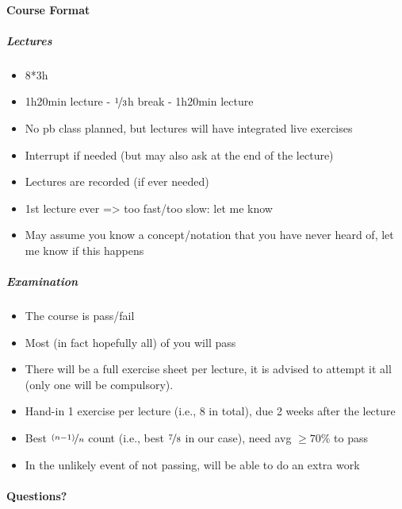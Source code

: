 \documentclass[11pt,a4paper]{report}
\begin{document}
	\paragraph{Course Format}
	\subparagraph{Lectures}
	\begin{itemize}
		\item 8*3h
		\item 1h20min lecture - $\nicefrac{1}{3}$h break - 1h20min lecture
		\item No pb class planned, but lectures will have integrated live exercises
		\item Interrupt if needed (but may also ask at the end of the lecture)
		\item Lectures are recorded (if ever needed)
		\item 1st lecture ever => too fast/too slow: let me know
		\item May assume you know a concept/notation that you have never heard of, let me know if this happens
	\end{itemize}
	\subparagraph{Examination}
	\begin{itemize}
		\item The course is pass/fail
		\item Most (in fact hopefully all) of you will pass
		\item There will be a full exercise sheet per lecture, it is advised to attempt it all (only one will be compulsory).
		\item Hand-in 1 exercise per lecture (i.e., 8 in total), due 2 weeks after the lecture
		\item Best $\nicefrac{(n-1)}{n}$ count (i.e., best $\nicefrac{7}{8}$ in our case), need avg $\geq 70 \%$ to pass
		\item In the unlikely event of not passing, will be able to do an extra work
	\end{itemize}
	\paragraph{Questions?}
	
	\newpage
	
	
	
	
	
	
	
	
	
	
	
	


	
	
	
\end{document}
